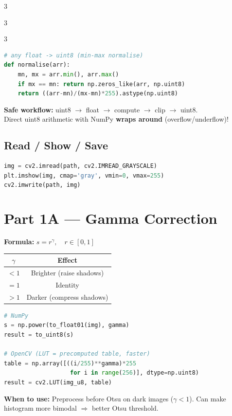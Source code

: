 \documentclass[9pt,landscape,a4paper]{extarticle}
\begin{document}
\begin{multicols*}{3}
\begin{multicols*}{3}
\begin{multicols}{3}
\begin{lstlisting}[language=Python]
# any float -> uint8 (min-max normalise)
def normalise(arr):
    mn, mx = arr.min(), arr.max()
    if mx == mn: return np.zeros_like(arr, np.uint8)
    return ((arr-mn)/(mx-mn)*255).astype(np.uint8)
\end{lstlisting}

\begin{notebox}
\textbf{Safe workflow:} uint8 $\to$ float $\to$ compute $\to$ clip $\to$ uint8. \\
Direct uint8 arithmetic with NumPy \textbf{wraps around} (overflow/underflow)!
\end{notebox}

\subsection{Read / Show / Save}
\begin{lstlisting}[language=Python]
img = cv2.imread(path, cv2.IMREAD_GRAYSCALE)
plt.imshow(img, cmap='gray', vmin=0, vmax=255)
cv2.imwrite(path, img)
\end{lstlisting}

\section{Part 1A — Gamma Correction}

\textbf{Formula:} $s = r^{\gamma},\quad r \in [0,1]$

\begin{center}
\begin{tabular}{@{}cc@{}}
\toprule
$\gamma$ & Effect \\
\midrule
$< 1$ & Brighter (raise shadows) \\
$= 1$ & Identity \\
$> 1$ & Darker (compress shadows) \\
\bottomrule
\end{tabular}
\end{center}

\begin{lstlisting}[language=Python]
# NumPy
s = np.power(to_float01(img), gamma)
result = to_uint8(s)

# OpenCV (LUT = precomputed table, faster)
table = np.array([((i/255)**gamma)*255
                   for i in range(256)], dtype=np.uint8)
result = cv2.LUT(img_u8, table)
\end{lstlisting}

\begin{tipbox}
\textbf{When to use:} Preprocess before Otsu on dark images ($\gamma < 1$).
Can make histogram more bimodal $\Rightarrow$ better Otsu threshold.
\end{tipbox}


\end{multicols}
\end{multicols*}
\end{multicols*}
\end{document}
